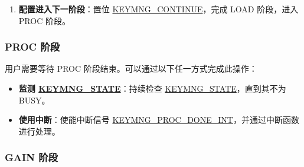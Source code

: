 \documentclass[main\_\_CN.tex]{subfiles}
\begin{document}
\begin{enumerate}
\begin{itemize}
\begin{enumerate}
            \item 将 \hyperref[para:k2info]{\begin{math}k2\_info\end{math}}（512 位）写入 \hyperref[mem:keymng-assist-info]{KEYMNG\_ASSIST\_INFO\_MEM}。
            \item 将 \hyperref[para:k1G]{\begin{math}k1*G\end{math}}（512 位）写入 \hyperref[mem:keymng-public-info]{KEYMNG\_PUBLIC\_INFO\_MEM}。
        \end{enumerate}
        \item \textbf{私钥恢复模式：}
        \begin{enumerate}
            \item 将 \hyperref[para:keyinfo]{\begin{math}key\_info\end{math}}（512 位）写入 \hyperref[mem:keymng-assist-info]{KEYMNG\_ASSIST\_INFO\_MEM}。
        \end{enumerate}
        \item \textbf{\hyperref[para:keyinfo]{\begin{math}key\_info\end{math}} 导出模式}：无需配置。
    \end{itemize}
    \item \textbf{配置进入下一阶段}：置位 \hyperref[fielddesc:KEYMNGCONTINUE]{KEYMNG\_CONTINUE}，完成 LOAD 阶段，进入 PROC 阶段。
\end{enumerate}

\subsubsection{PROC 阶段}

用户需要等待 PROC 阶段结束。可以通过以下任一方式完成此操作：
\begin{itemize}
    \item \textbf{监测 \hyperref[fielddesc:KEYMNGSTATE]{KEYMNG\_STATE}}：持续检查  \hyperref[fielddesc:KEYMNGSTATE]{KEYMNG\_STATE}，直到其不为 BUSY。
    \item \textbf{使用中断}：使能中断信号 \hyperref[int:KEYMNGPROCDONEINT]{KEYMNG\_PROC\_DONE\_INT}，并通过中断函数进行处理。
\end{itemize}

\subsubsection{GAIN 阶段}
\end{document}
